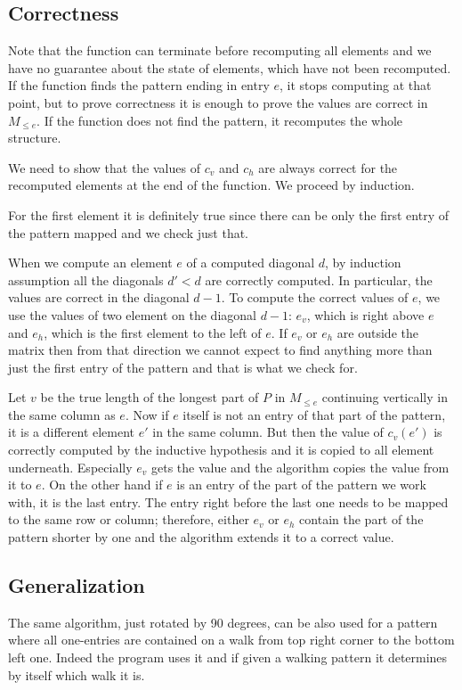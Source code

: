 \subsection{Correctness}
Note that the function can terminate before recomputing all elements and we have no guarantee about the state of elements, which have not been recomputed. If the function finds the pattern ending in entry $e$, it stops computing at that point, but to prove correctness it is enough to prove the values are correct in $M_{\leq e}$. If the function does not find the pattern, it recomputes the whole structure.

We need to show that the values of $c_v$ and $c_h$ are always correct for the recomputed elements at the end of the function. We proceed by induction.

For the first element it is definitely true since there can be only the first entry of the pattern mapped and we check just that.

When we compute an element $e$ of a computed diagonal $d$, by induction assumption all the diagonals $d'<d$ are correctly computed. In particular, the values are correct in the diagonal $d-1$. To compute the correct values of $e$, we use the values of two element on the diagonal $d-1$: $e_v$, which is right above $e$ and $e_h$, which is the first element to the left of $e$. If $e_v$ or $e_h$ are outside the matrix then from that direction we cannot expect to find anything more than just the first entry of the pattern and that is what we check for.

Let $v$ be the true length of the longest part of $P$ in $M_{\leq e}$ continuing vertically in the same column as $e$. Now if $e$ itself is not an entry of that part of the pattern, it is a different element $e'$ in the same column. But then the value of $c_v(e')$ is correctly computed by the inductive hypothesis and it is copied to all element underneath. Especially $e_v$ gets the value and the algorithm copies the value from it to $e$. On the other hand if $e$ is an entry of the part of the pattern we work with, it is the last entry. The entry right before the last one needs to be mapped to the same row or column; therefore, either $e_v$ or $e_h$ contain the part of the pattern shorter by one and the algorithm extends it to a correct value.

\subsection{Generalization}
The same algorithm, just rotated by 90 degrees, can be also used for a pattern where all one-entries are contained on a walk from top right corner to the bottom left one. Indeed the program uses it and if given a walking pattern it determines by itself which walk it is.

